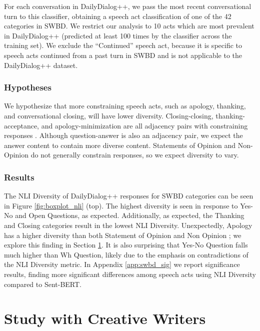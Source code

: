 \documentclass[11pt]{article}
\begin{document}
For each conversation in DailyDialog++, we pass the most recent conversational turn to this classifier, obtaining a speech act classification of one of the 42 categories in SWBD.  We restrict our analysis to 10 acts which are most prevalent in DailyDialog++ (predicted at least 100 times by the classifier across the training set).
We  exclude the ``Continued'' speech act, because it is specific to speech acts continued from a past turn in SWBD and is not applicable to the DailyDialog++ dataset. 

\subsubsection{Hypotheses}
We hypothesize that more constraining speech acts, such as apology, thanking, and conversational closing, will have lower diversity.  Closing-closing, thanking-acceptance, and apology-minimization are all adjacency pairs with constraining responses \cite{levinson_1983}.   Although question-answer is also an adjacency pair, we expect the answer content to contain more diverse content. 
Statements of Opinion and Non-Opinion do not generally constrain responses, so we expect diversity
to vary.


\subsubsection{Results}\label{sec:swbdresults}

The NLI Diversity of DailyDialog++ responses for SWBD categories can be seen in Figure \ref{fig:boxplot_nli} (top).  The highest diversity is seen in response to Yes-No and Open Questions, as expected.  Additionally, as expected, the Thanking and Closing categories result in the lowest NLI Diversity.  Unexpectedly, Apology has a higher diversity than both Statement of Opinion and Non Opinion
; we explore this finding in Section \ref{sec:writers}.  It is also surprising that Yes-No Question falls much higher than Wh Question, likely due to the emphasis on contradictions of the NLI Diversity metric.  In Appendix \ref{app:swbd_sig} we report significance results, finding more significant differences among speech acts using NLI Diversity compared to Sent-BERT.


  


\section{Study  with Creative Writers}\label{sec:writers}
\end{document}

